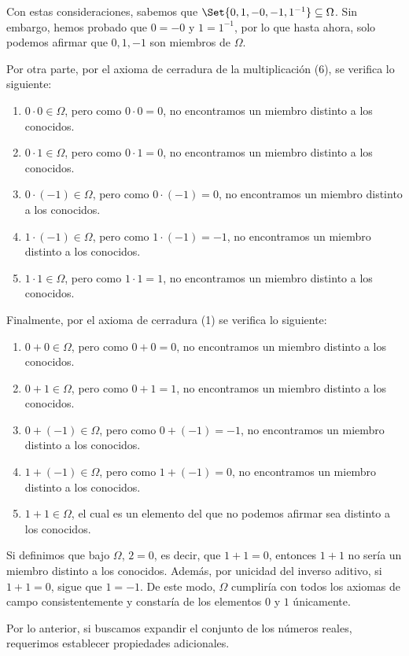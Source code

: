 \documentclass[11pt]{article}
\let\set\Set
\let\subset\subseteq
\begin{document}
Con estas consideraciones, sabemos que $\set{0,1,-0,-1,1^{-1}}\subset \Omega$. Sin embargo, hemos probado que $0=-0$ y $1=1^{-1}$, por lo que hasta ahora, solo podemos afirmar que $0,1,-1$ son miembros de $\Omega$.

Por otra parte, por el axioma de cerradura de la multiplicación (6), se verifica lo siguiente:

\begin{enumerate}[label=\roman*)]
    \item $0\cdot 0\in \Omega$, pero como $0\cdot 0=0$, no encontramos un miembro distinto a los conocidos.
    \item $0 \cdot 1 \in \Omega$, pero como $0\cdot 1=0$, no encontramos un miembro distinto a los conocidos. 
    \item $0 \cdot (-1) \in \Omega$, pero como $0\cdot (-1)=0$, no encontramos un miembro distinto a los conocidos.
    \item $1\cdot (-1) \in \Omega$, pero como $1\cdot (-1)=-1$, no encontramos un miembro distinto a los conocidos.
    \item $1\cdot 1\in \Omega$, pero como $1\cdot 1=1$, no encontramos un miembro distinto a los conocidos.
\end{enumerate}
Finalmente, por el axioma de cerradura (1) se verifica lo siguiente:
\begin{enumerate}[label=\roman*)]
    \item $0+0 \in \Omega$, pero como $0+0=0$, no encontramos un miembro distinto a los conocidos.
    \item $0+1 \in \Omega$, pero como $0+1=1$, no encontramos un miembro distinto a los conocidos.
    \item $0+(-1) \in \Omega$, pero como $0+(-1)=-1$, no encontramos un miembro distinto a los conocidos.
    \item $1+(-1)\in \Omega$, pero como $1+(-1)=0$, no encontramos un miembro distinto a los conocidos.
    \item$1+1\in \Omega$, el cual es un elemento del que no podemos afirmar sea distinto a los conocidos.
\end{enumerate}
Si definimos que bajo $\Omega$, $2=0$, es decir, que $1+1=0$, entonces $1+1$ no sería un miembro distinto a los conocidos. Además, por unicidad del inverso aditivo, si $1+1=0$, sigue que $1=-1$. De este modo, $\Omega$ cumpliría con todos los axiomas de campo consistentemente y constaría de los elementos $0$ y $1$ únicamente.

Por lo anterior, si buscamos expandir el conjunto de los números reales, requerimos establecer propiedades adicionales.
\end{document}
